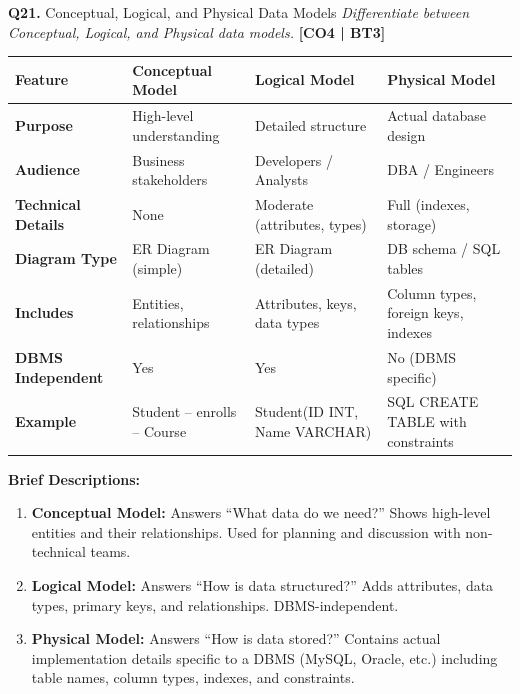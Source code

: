 \documentclass[12pt,a4paper]{article}
\newcommand{\Qno}[1]{\textbf{\color{darkred}Q#1.}}
\newcommand{\term}[1]{\textbf{\color{headingcolor}#1}}
\begin{document}
\vspace{8pt}

\begin{questionbox}{\Qno{21} Conceptual, Logical, and Physical Data Models}
\textit{Differentiate between Conceptual, Logical, and Physical data models.} \hfill \textbf{[CO4 | BT3]}
\end{questionbox}

\begin{answerenv}

\begin{center}
\begin{tabular}{>{\bfseries}p{2.8cm} p{3.5cm} p{3.5cm} p{3.5cm}}
\toprule
\textbf{Feature} & \textbf{Conceptual Model} & \textbf{Logical Model} & \textbf{Physical Model} \\
\midrule
Purpose & High-level understanding & Detailed structure & Actual database design \\[4pt]
Audience & Business stakeholders & Developers / Analysts & DBA / Engineers \\[4pt]
Technical Details & None & Moderate (attributes, types) & Full (indexes, storage) \\[4pt]
Diagram Type & ER Diagram (simple) & ER Diagram (detailed) & DB schema / SQL tables \\[4pt]
Includes & Entities, relationships & Attributes, keys, data types & Column types, foreign keys, indexes \\[4pt]
DBMS Independent & Yes & Yes & No (DBMS specific) \\[4pt]
Example & Student -- enrolls -- Course & Student(ID INT, Name VARCHAR) & SQL CREATE TABLE with constraints \\
\bottomrule
\end{tabular}
\end{center}

\vspace{6pt}
\textbf{\color{headingcolor}Brief Descriptions:}
\begin{enumerate}[leftmargin=1.8em, itemsep=4pt]
  \item \term{Conceptual Model:} Answers ``What data do we need?'' Shows high-level entities and their relationships. Used for planning and discussion with non-technical teams.
  \item \term{Logical Model:} Answers ``How is data structured?'' Adds attributes, data types, primary keys, and relationships. DBMS-independent.
  \item \term{Physical Model:} Answers ``How is data stored?'' Contains actual implementation details specific to a DBMS (MySQL, Oracle, etc.) including table names, column types, indexes, and constraints.
\end{enumerate}

\end{answerenv}
\end{document}
